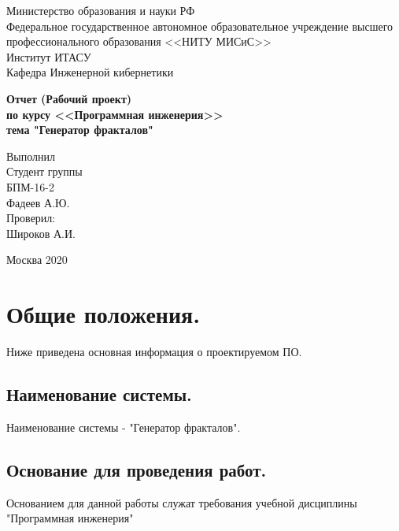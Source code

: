 \documentclass[a4paper,12pt,preview]{report} %
\begin{document}
	
	\begin{center}
		Министерство образования и науки РФ \\
		Федеральное государственное автономное образовательное учреждение высшего профессионального образования <<НИТУ МИСиС>>\\
		Институт ИТАСУ\\
		Кафедра Инженерной кибернетики\\
	\end{center}
	
	
	\vfill
	
	\begin{center}
		\Large\textbf{Отчет  (Рабочий проект) \\
			по курсу <<Программная инженерия>>\\
			тема "Генератор фракталов"}
	\end{center}
	
	\vfill
	
	\begin{FlushRight}
		Выполнил\\
		Студент группы \\
		БПМ-16-2 \\
		Фадеев А.Ю. \\
		[\baselineskip]
		Проверил: \\
		Широков А.И. \\
		[9\baselineskip]
	\end{FlushRight}
	
	
	\begin{center}
		Москва 2020
	\end{center}
	
	\thispagestyle{empty}
	\newpage
	
	\tableofcontents
	\newpage
	
	\section{Общие положения.}
	
	Ниже приведена основная информация о проектируемом ПО.
	
	\subsection{Наименование системы.}
	Наименование системы - "Генератор фракталов".
	
	\subsection{Основание для проведения работ.}
	Основанием для данной работы служат требования учебной дисциплины "Программная инженерия"
	
\end{document}

